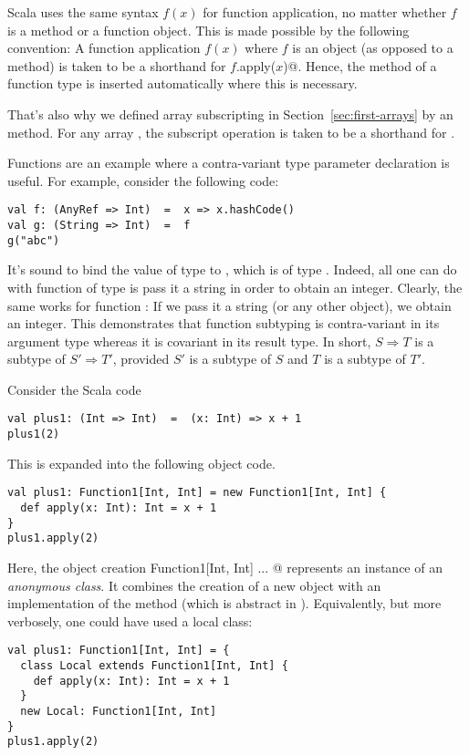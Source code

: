 Scala uses the same syntax $f(x)$ for function application, no matter
whether $f$ is a method or a function object. This is made possible by
the following convention: A function application $f(x)$ where $f$ is
an object (as opposed to a method) is taken to be a shorthand for
\lstinline@$f$.apply($x$)@. Hence, the  method of a
function type is inserted automatically where this is necessary.

That's also why we defined array subscripting in
Section~\ref{sec:first-arrays} by an  method.  For any
array , the subscript operation  is taken to be a
shorthand for .

Functions are an example where a contra-variant type parameter
declaration is useful. For example, consider the following code:
\begin{lstlisting}
val f: (AnyRef => Int)  =  x => x.hashCode()
val g: (String => Int)  =  f
g("abc")
\end{lstlisting}
It's sound to bind the value  of type  to
, which is of type . Indeed, all one can
do with function of type  is pass it a string in
order to obtain an integer. Clearly, the same works for function
: If we pass it a string (or any other object), we obtain an
integer.  This demonstrates that function subtyping is contra-variant
in its argument type whereas it is covariant in its result type.
In short, $S \Rightarrow T$ is a subtype of $S' \Rightarrow T'$, provided
$S'$ is a subtype of $S$ and $T$ is a subtype of $T'$.

\example Consider the Scala code
\begin{lstlisting}
val plus1: (Int => Int)  =  (x: Int) => x + 1
plus1(2)
\end{lstlisting}
This is expanded into the following object code.
\begin{lstlisting}
val plus1: Function1[Int, Int] = new Function1[Int, Int] {
  def apply(x: Int): Int = x + 1
}
plus1.apply(2)
\end{lstlisting}
Here, the object creation \lstinline@new Function1[Int, Int]{ ... }@
represents an instance of an {\em anonymous class}. It combines the
creation of a new  object with an implementation of 
the  method (which is abstract in ).
Equivalently, but more verbosely, one could have used a local class:
\begin{lstlisting}
val plus1: Function1[Int, Int] = {
  class Local extends Function1[Int, Int] {
    def apply(x: Int): Int = x + 1
  }
  new Local: Function1[Int, Int]
}
plus1.apply(2)
\end{lstlisting}
 
